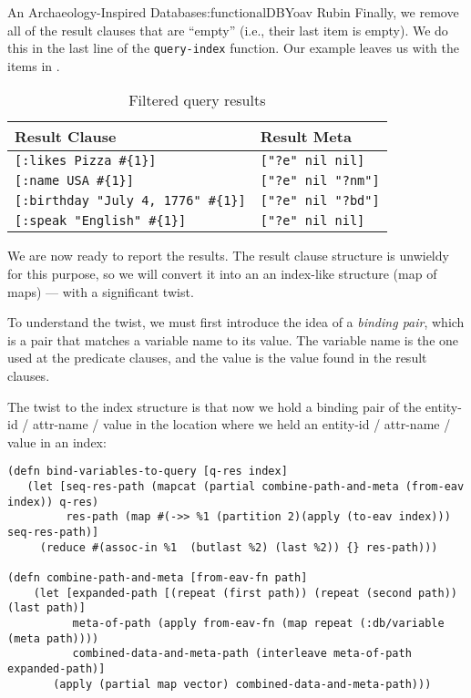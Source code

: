 \begin{aosachapter}{An Archaeology-Inspired Database}{s:functionalDB}{Yoav Rubin}
Finally, we remove all of the result clauses that are ``empty'' (i.e.,
their last item is empty). We do this in the last line of the
\texttt{query-index} function. Our example leaves us with the items in
.

\begin{table}
\centering
{\footnotesize
{}
\begin{tabular}{ll}
\hline
\textbf{Result Clause} & \textbf{Result Meta} \\
\hline
\verb|[:likes Pizza #{1}]| & \verb|["?e" nil nil]| \\
\verb|[:name USA #{1}]| & \verb|["?e" nil "?nm"]| \\ 
\verb|[:birthday "July 4, 1776" #{1}]| & \verb|["?e" nil "?bd"]| \\
\verb|[:speak "English" #{1}]| & \verb|["?e" nil nil]| \\
\hline
\end{tabular}
}
\caption{Filtered query results}
\label{500l.functionaldb.filteredqueryresults}
\end{table}

We are now ready to report the results. The result clause structure is
unwieldy for this purpose, so we will convert it into an an index-like
structure (map of maps) --- with a significant twist.

To understand the twist, we must first introduce the idea of a
\emph{binding pair}, which is a pair that matches a variable name to its
value. The variable name is the one used at the predicate clauses, and
the value is the value found in the result clauses.

The twist to the index structure is that now we hold a binding pair of
the entity-id / attr-name / value in the location where we held an
entity-id / attr-name / value in an index:

\begin{verbatim}
(defn bind-variables-to-query [q-res index]
   (let [seq-res-path (mapcat (partial combine-path-and-meta (from-eav index)) q-res)         
         res-path (map #(->> %1 (partition 2)(apply (to-eav index))) seq-res-path)] 
     (reduce #(assoc-in %1  (butlast %2) (last %2)) {} res-path)))
     
(defn combine-path-and-meta [from-eav-fn path]
    (let [expanded-path [(repeat (first path)) (repeat (second path)) (last path)] 
          meta-of-path (apply from-eav-fn (map repeat (:db/variable (meta path))))
          combined-data-and-meta-path (interleave meta-of-path expanded-path)]
       (apply (partial map vector) combined-data-and-meta-path)))
\end{verbatim}


\end{aosachapter}
